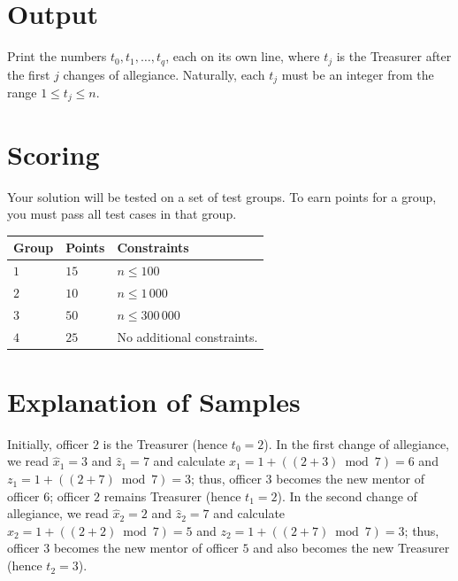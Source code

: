 \section*{Output}
Print the numbers $t_0, t_1, \ldots, t_q$, each on its own line, where $t_j$ is
the Treasurer after the first $j$ changes of allegiance. Naturally, each $t_j$
must be an integer from the range $1 \leq t_j \leq n$.

\section*{Scoring}
Your solution will be tested on a set of test groups.
To earn points for a group, you must pass all test cases in that group.

\noindent
\begin{tabular}{| l | l | p{12cm} |}
  \hline
  \textbf{Group} & \textbf{Points} & \textbf{Constraints} \\ \hline
  $1$ & $15$ & $n \leq 100$ \\ \hline
  $2$ & $10$ & $n \leq 1\,000$ \\ \hline
  $3$ & $50$ & $n \leq 300\,000$ \\ \hline
  $4$ & $25$ & No additional constraints. \\ \hline
\end{tabular}

\section*{Explanation of Samples}
Initially, officer $2$ is the Treasurer (hence $t_0 = 2$). In the first change of
allegiance, we read $\hat{x}_1 = 3$ and $\hat{z}_1 = 7$ and calculate
$x_1 = 1 + ((2+3) \bmod 7) = 6$ and $z_1 = 1 + ((2+7) \bmod 7) = 3$; thus,
officer $3$ becomes the new mentor of officer $6$; officer $2$ remains Treasurer
(hence $t_1 = 2$). In the second change of allegiance, we read $\hat{x}_2 = 2$
and $\hat{z}_2 = 7$ and calculate $x_2 = 1 + ((2+2) \bmod 7) = 5$ and
$z_2 = 1 + ((2+7) \bmod 7) = 3$; thus, officer $3$ becomes the new mentor of
officer $5$ and also becomes the new Treasurer (hence $t_2 = 3$).
